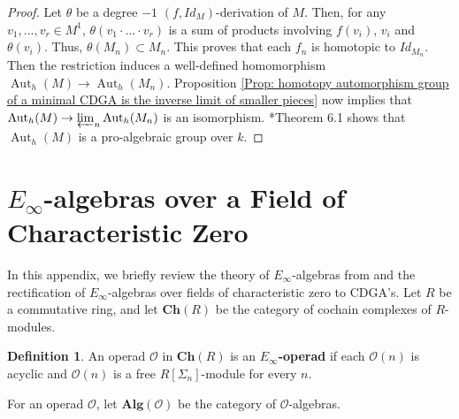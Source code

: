 \documentclass[11pt]{amsart}
\theoremstyle{definition}
\newtheorem{definition}[theorem]{Definition}
\numberwithin{equation}{section}
\numberwithin{equation}{section}
\DeclareMathOperator{\Aut}{Aut}
\begin{document}
\begin{proof}
Let $\theta$ be a degree $-1$ $(f,Id_M)$-derivation of $M$. Then, for any $v_1,...,v_r\in M^1$, $\theta(v_1\cdot...\cdot v_r)$ is a sum of products involving $f(v_i)$, $v_i$ and $\theta(v_i)$. Thus, $\theta(M_n)\subset M_n$. This proves that each $f_n$ is homotopic to $Id_{M_n}$. Then the restriction induces a well-defined homomorphism $\Aut_h(M)\rightarrow \Aut_h(M_n)$. Proposition \ref{Prop: homotopy automorphism group of a minimal CDGA is the inverse limit of smaller pieces} now implies that $\Aut_h(M)\rightarrow \varprojlim_n\Aut_h(M_n)$ is an isomorphism. \cite{Sullivan-rational-homotopy}*{Theorem 6.1} shows that $\Aut_h(M)$ is a pro-algebraic group over $k$.
\end{proof}

\section{$E_{\infty}$-algebras over a Field of Characteristic Zero}

In this appendix, we briefly review the theory of $E_{\infty}$-algebras from \cite{Hinich-Model-Structure-on-homotopy-algbras}\cite{Kriz-May-operads-algebras-modules-motives}\cite{May-operads-sheaf-cohomology} and the rectification of $E_{\infty}$-algebras over fields of characteristic zero to CDGA's. Let $R$ be a commutative ring, and let $\mathbf{Ch}(R)$ be the category of cochain complexes of $R$-modules.

\begin{definition}
An operad $\mathcal{O}$ in $\mathbf{Ch}(R)$ is an \textbf{$E_{\infty}$-operad} if each $\mathcal{O}(n)$ is acyclic and $\mathcal{O}(n)$ is a free $R[\Sigma_n]$-module for every $n$.
\end{definition}


For an operad $\mathcal{O}$, let $\mathbf{Alg}(\mathcal{O})$ be the category of $\mathcal{O}$-algebras.
\end{document}
